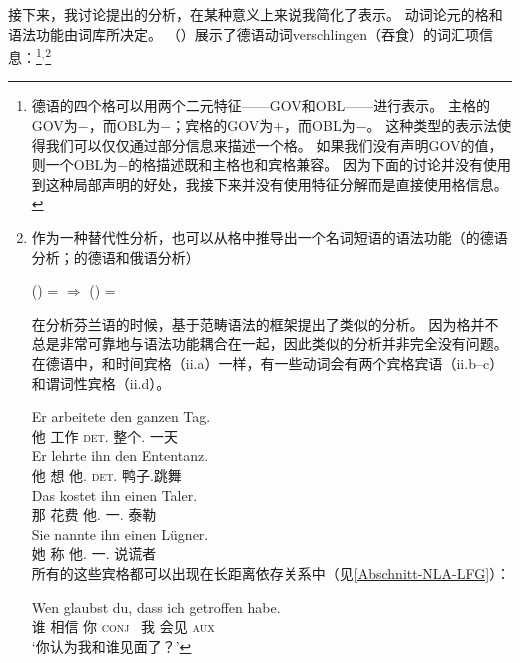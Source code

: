 接下来，我讨论\citet[\S~2.1.3]{Berman96a-u}提出的分析，在某种意义上来说我简化了表示。
动词论元的格和语法功能由词库所决定\citep[]{Berman96a-u}。
（）展示了德语动词verschlingen（吞食）的词汇项信息：\footnote{%
  德语的四个格可以用两个二元特征——{\small GOV}和{\small OBL}——进行表示\citep[]{Berman96a-u}。
  主格的{\small GOV}为$-$，而{\small OBL}为$-$；宾格的{\small GOV}为$+$，而{\small OBL}为$-$。
  这种类型的表示法使得我们可以仅仅通过部分信息来描述一个格。
  如果我们没有声明{\small GOV}的值，则一个{\small OBL}为$-$的格描述既和主格也和宾格兼容。
  因为下面的讨论并没有使用到这种局部声明的好处，我接下来并没有使用特征分解而是直接使用格信息。
}$^,$\footnote{%
  作为一种替代性分析，也可以从格中推导出一个名词短语的语法功能（\citealp[]{Berman2003a}的德语分析；\citealp[, ]{Bresnan2001a}的德语和俄语分析）

\ea
\label{Kasus-Implikation-Berman}
\upshape      (\downsp \case) = \mdacc{} $\Rightarrow$ (\upsp \lfgobj) = \down{}
\z

\noindent
  \citet[\S~2.1]{Karttunen89a-u}在分析芬兰语的时候，基于范畴语法\indexcxgc 的框架提出了类似的分析。
  因为格并不总是非常可靠地与语法功能耦合在一起，因此类似的分析并非完全没有问题。
  在德语中，和时间宾格（ii.a）一样，有一些动词会有两个宾格宾语（ii.b--c）和谓词性宾格（ii.d）。

\eal
\ex 
\gll Er arbeitete den ganzen Tag.\\
     他 工作 \textsc{det}.\acc{} 整个.\acc{} 一天\\
\ex 
\gll Er lehrte ihn den Ententanz.\\
     他 想 他.\acc{} \textsc{det}.\acc{} 鸭子.跳舞\\
\ex 
\gll Das kostet ihn einen Taler.\\
     那 花费 他.\acc{} 一.\acc{} 泰勒\\
\ex 
\gll Sie nannte ihn einen Lügner.\\
     她 称 他.\acc{} 一.\acc{} 说谎者\\
\zl
所有的这些宾格都可以出现在长距离依存关系中（见\ref{Abschnitt-NLA-LFG}）：

\ea
\gll Wen glaubst du, dass ich getroffen habe.\\
    谁 相信 你 \textsc{conj}  我 会见 \textsc{aux} \\
\glt `你认为我和谁见面了？'
\z

}
